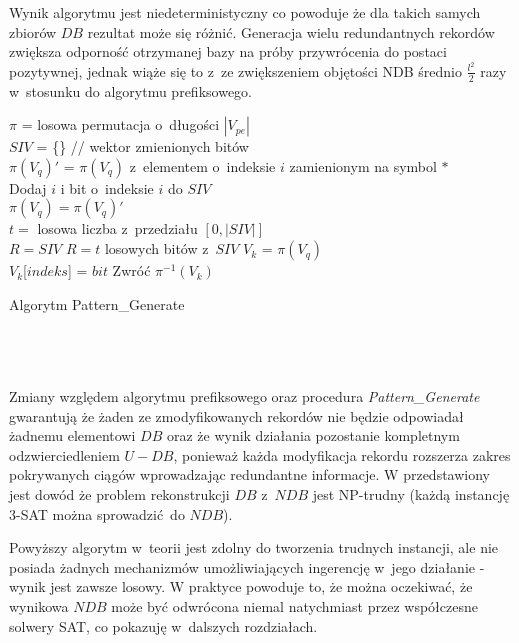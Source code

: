 Wynik algorytmu jest niedeterministyczny co powoduje że dla takich samych zbiorów $DB$ rezultat może się różnić. Generacja wielu redundantnych rekordów zwiększa odporność otrzymanej bazy na próby przywrócenia do postaci pozytywnej, jednak wiąże się to z~ze zwiększeniem objętości NDB średnio $\frac{l^2}{2}$ razy w~stosunku do algorytmu prefiksowego.


\begin{algorithm}[!htb]
    \SetAlgoLined
    $\pi$ = losowa permutacja o~długości $|V_{pe}|$\\
    $SIV$ = \{\} // wektor zmienionych bitów\\
    {
        $\pi(V_{q})'$ = $\pi(V_{q})$ z~elementem o~indeksie $i$ zamienionym na symbol $*$\\
        {
            Dodaj $i$ i bit o~indeksie $i$ do $SIV$\\
            $\pi(V_{q}) = \pi(V_{q})'$\\
        }  
    }
    $t =$ losowa liczba z~przedziału $[0, |SIV|]$\\
    {
        $R = SIV$
    }
    \Else
    {
        $R = t$ losowych bitów z~$SIV$ 
    }
    $V_k$ = $\pi(V_{q})$\\
    {
        $V_k$[$indeks$] = $bit$
    }
    Zwróć $\pi^{-1}(V_k)$ 
    
    \caption{Algorytm Pattern\_Generate}
    \label{alg:pattern-generate}
\end{algorithm}
~\\\\\\

\newpage
Zmiany względem algorytmu prefiksowego oraz procedura \textit{Pattern\_Generate} gwarantują że żaden ze zmodyfikowanych rekordów nie będzie odpowiadał żadnemu elementowi $DB$ oraz że wynik działania pozostanie kompletnym odzwierciedleniem $U - DB$,
ponieważ każda modyfikacja rekordu rozszerza zakres pokrywanych ciągów wprowadzając redundantne informacje.
W \cite{NRI-Esponda} przedstawiony jest dowód że problem rekonstrukcji $DB$ z~$NDB$ jest NP-trudny (każdą instancję 3-SAT można sprowadzić do $NDB$).

Powyższy algorytm w~teorii jest zdolny do tworzenia trudnych instancji, ale nie posiada żadnych mechanizmów umożliwiających ingerencję w~jego działanie - wynik jest zawsze losowy.
W praktyce powoduje to, że można oczekiwać, że wynikowa $NDB$ może być odwrócona niemal natychmiast przez współczesne solwery SAT, co pokazuję w~dalszych rozdziałach.       


